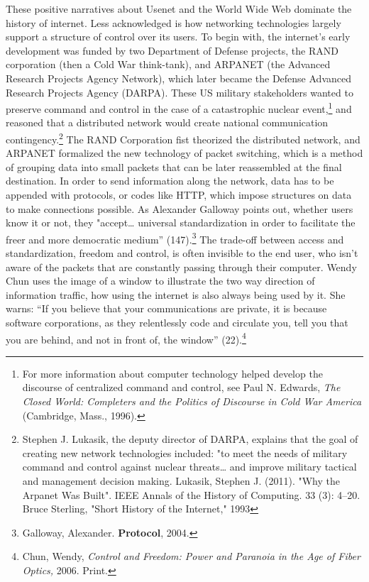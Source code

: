 \documentclass[11pt]{article}
\begin{document}
These positive narratives about Usenet and the World Wide Web dominate
the history of internet. Less acknowledged is how networking
technologies largely support a structure of control over its users. To
begin with, the internet's early development was funded by two
Department of Defense projects, the RAND corporation (then a Cold War
think-tank), and ARPANET (the Advanced Research Projects Agency
Network), which later became the Defense Advanced Research Projects
Agency (DARPA). These US military stakeholders wanted to preserve
command and control in the case of a catastrophic nuclear
event,\footnote{For more information about computer technology helped develop
the discourse of centralized command and control, see Paul N. Edwards,
\emph{The Closed World: Completers and the Politics of Discourse in Cold
War America} (Cambridge, Mass., 1996).\label{orgd224cfa}} and reasoned that a distributed network would create
national communication contingency.\footnote{Stephen J. Lukasik, the deputy director of DARPA, explains
that the goal of creating new network technologies included: "to meet
the needs of military command and control against nuclear
threats\ldots{} and improve military tactical and management decision
making. Lukasik, Stephen J. (2011). "Why the Arpanet Was Built". IEEE
Annals of the History of Computing. 33 (3): 4–20. Bruce Sterling,
"Short History of the Internet," 1993} The RAND Corporation fist
theorized the distributed network, and ARPANET formalized the new
technology of packet switching, which is a method of grouping data
into small packets that can be later reassembled at the final
destination. In order to send information along the network, data has
to be appended with protocols, or codes like HTTP, which impose
structures on data to make connections possible.  As Alexander
Galloway points out, whether users know it or not, they
"accept\ldots{} universal standardization in order to facilitate the freer
and more democratic medium” (147).\footnote{Galloway, Alexander. \textbf{Protocol}, 2004.} The trade-off between access
and standardization, freedom and control, is often invisible to the
end user, who isn't aware of the packets that are constantly passing
through their computer. Wendy Chun uses the image of a window to
illustrate the two way direction of information traffic, how using the
internet is also always being used by it. She warns: “If you believe
that your communications are private, it is because software
corporations, as they relentlessly code and circulate you, tell you
that you are behind, and not in front of, the window” (22).\footnote{Chun, Wendy, \emph{Control and Freedom: Power and Paranoia in the
Age of Fiber Optics,} 2006. Print.}
\end{document}
